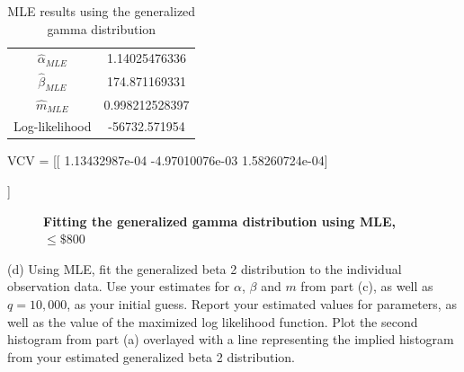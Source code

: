 \documentclass[letterpaper,12pt]{article}
\theoremstyle{definition}
\begin{document}
\begin{table}[h!]
 \centering
 \caption{MLE results using the generalized gamma distribution}
 \begin{tabular}{|c | c |} 
  \hline
  $\hat{\alpha}_{MLE}$ & 1.14025476336\\ 
  $\hat{\beta}_{MLE}$ & 174.871169331\\
  $\hat{m}_{MLE}$ & 0.998212528397\\
  Log-likelihood & -56732.571954\\
  \hline
  \end{tabular}
\end{table}
\par
VCV =  [[  1.13432987e-04  -4.97010076e-03   1.58260724e-04] \par
 [ -4.97010076e-03   1.00020145e+00   4.21884885e-03] \par
 [  1.58260724e-04   4.21884885e-03   1.27378050e-02]] \par
\par

\begin{figure}[H]\centering\captionsetup{width=4.0in}
  \caption{\textbf{Fitting the generalized gamma distribution using MLE, $\leq \$800$}}
\end{figure}
\par\bigskip

\noindent(d) Using MLE, fit the generalized beta 2 distribution to the individual observation data. Use your estimates for $\alpha$, $\beta$ and $m$ from part (c), as well as $q = 10,000$, as your initial guess. Report your estimated values for parameters, as well as the value of the maximized log likelihood function. Plot the second histogram from part (a) overlayed with a line representing
the implied histogram from your estimated generalized beta 2 distribution.
\par\bigskip
\end{document}
